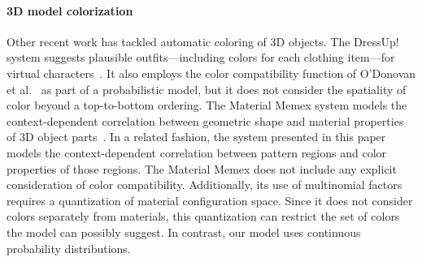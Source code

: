 \paragraph{3D model colorization}
Other recent work has tackled automatic coloring of 3D objects. The DressUp! system suggests plausible outfits---including colors for each clothing item---for virtual characters~\cite{DressUp}. It also employs the color compatibility function of O'Donovan et al.~ as part of a probabilistic model, but it does not consider the spatiality of color beyond a top-to-bottom ordering. The Material Memex system models the context-dependent correlation between geometric shape and material properties of 3D object parts~\cite{MaterialMemex}. In a related fashion, the system presented in this paper models the context-dependent correlation between pattern regions and color properties of those regions. The Material Memex does not include any explicit consideration of color compatibility. Additionally, its use of multinomial factors requires a quantization of material configuration space. Since it does not consider colors separately from materials, this quantization can restrict the set of colors the model can possibly suggest. In contrast, our model uses continuous probability distributions.